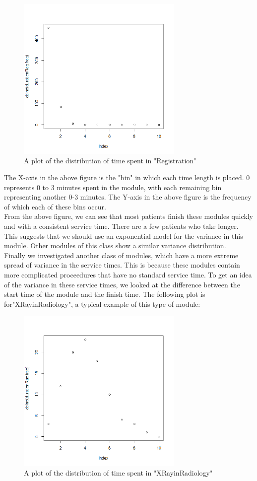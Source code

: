 \documentclass[12pt]{article}
\begin{document}
\begin{figure}[H]
	\centering
	\includegraphics[width=8cm]{RegistrationVariance}
	\caption{A plot of the distribution of time spent in "Registration"}
\end{figure}
The X-axis in the above figure is the "bin" in which each time length is placed. 0 represents 0 to 3 minutes spent in the module, with each remaining bin representing another 0-3 minutes. The Y-axis in the above figure is the frequency of which each of these bins occur. \\
From the above figure, we can see that most patients finish these modules quickly and with a consistent service time. There are a few patients who take longer. This suggests that we should use an exponential model for the variance in this module. Other modules of this class show a similar variance distribution. \\
Finally we investigated another class of modules, which have a more extreme spread of variance in the service times. This is because these modules contain more complicated proceedures that have no standard service time. To get an idea of the variance in these service times, we looked at the difference between the start time of the module and the finish time. The following plot is for"XRayinRadiology", a typical example of this type of module: \\
\begin{figure}[H]
	\centering
	\includegraphics[width=8cm]{RadVariance}
	\caption{A plot of the distribution of time spent in "XRayinRadiology"}
\end{figure}
\end{document}
